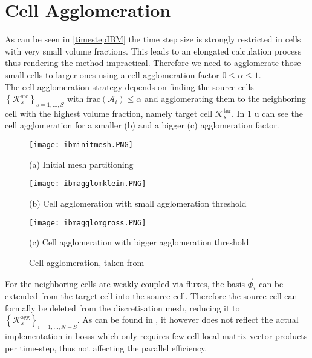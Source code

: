 	\section{Cell Agglomeration}
	\label{cellAgglomeration}
	As can be seen in \ref{timestepIBM} the time step size is strongly restricted in cells with very small volume fractions. This leads to an elongated calculation process thus rendering the method impractical. Therefore we need to agglomerate those small cells to larger ones using a cell agglomeration factor $0 \leq \alpha \leq 1$. \\
	The cell agglomeration strategy depends on finding the source cells $\left\{\mathcal{K}_s^\text{src} \right\}_{s=1,...,S}$ with $\text{frac}(\mathcal{A}_i) \leq \alpha$ and agglomerating them to the neighboring cell with the highest volume fraction, namely target cell $\mathcal{K}_s^\text{tar}$. In \ref{fig:agglomeration} u can see the cell agglomeration for a smaller (b) and a bigger (c) agglomeration factor. \\
	\begin{figure}[htp]
		\centering
		\begin{minipage}[b]{0.3\textwidth}
			\centering
			\texttt{[image: ibminitmesh.PNG]}
			\caption*{(a) Initial mesh partitioning \newline \newline}
			\label{fig:init}
		\end{minipage}%
		\begin{minipage}[b]{0.3\textwidth}
			\centering
			\texttt{[image: ibmagglomklein.PNG]}
			\caption*{(b) Cell agglomeration with small agglomeration threshold}
			\label{fig:agglomgklein}
		\end{minipage}
		\begin{minipage}[b]{0.3\textwidth}
			\centering
			\texttt{[image: ibmagglomgross.PNG]}
			\caption*{(c) Cell agglomeration with bigger agglomeration threshold}
			\label{fig:agglomgross}
		\end{minipage}%
		\caption{Cell agglomeration, taken from \cite{paper}}\label{fig:agglomeration}
	\end{figure}
	
	For the neighboring cells are weakly coupled via fluxes, the basis $\vec{\Phi}_i$ can be extended from the target cell into the source cell. Therefore the source cell can formally be deleted from the discretisation mesh, reducing it to $\left\{\mathcal{K}_s^\text{agg} \right\}_{i=1,...,N-S}$.
	As can be found in \cite{paper}, it however does not reflect the actual implementation in \gls{bosss} which only requires few cell-local matrix-vector products per time-step, thus not affecting the parallel efficiency.
	